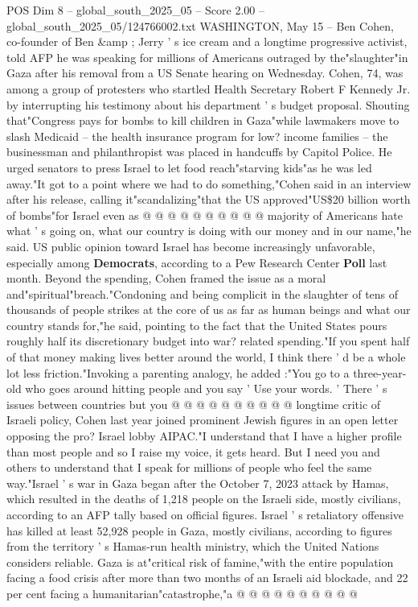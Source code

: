 \begin{textsample}{POS Dim 8 – global\_south\_2025\_05 – Score 2.00 – global\_south\_2025\_05/124766002.txt}  \label{ex:f8_pos_447}
WASHINGTON, May 15 -- Ben Cohen, co-founder of Ben \&amp ; Jerry ' s ice cream and a longtime progressive activist, told AFP he was speaking for millions of Americans outraged by the"slaughter"in Gaza after his removal from a US Senate hearing on Wednesday.
Cohen, 74, was among a group of protesters who startled Health Secretary Robert F Kennedy Jr. by interrupting his testimony about his department ' s budget proposal.
Shouting that"Congress pays for bombs to kill children in Gaza"while lawmakers move to slash Medicaid -- the health insurance program for low? income families -- the businessman and philanthropist was placed in handcuffs by Capitol Police.
He urged senators to press Israel to let food reach"starving kids"as he was led away."It got to a point where we had to do something,"Cohen said in an interview after his release, calling it"scandalizing"that the US approved"US\$20 billion worth of bombs"for Israel even as @ @ @ @ @ @ @ @ @ @ majority of Americans hate what ' s going on, what our country is doing with our money and in our name,"he said.
US public opinion toward Israel has become increasingly unfavorable, especially among \textbf{Democrats}, according to a Pew Research Center \textbf{Poll} last month.
Beyond the spending, Cohen framed the issue as a moral and"spiritual"breach."Condoning and being complicit in the slaughter of tens of thousands of people strikes at the core of us as far as human beings and what our country stands for,"he said, pointing to the fact that the United States pours roughly half its discretionary budget into war? related spending."If you spent half of that money making lives better around the world, I think there ' d be a whole lot less friction."Invoking a parenting analogy, he added :"You go to a three-year-old who goes around hitting people and you say ' Use your words. ' There ' s issues between countries but you @ @ @ @ @ @ @ @ @ @ longtime critic of Israeli policy, Cohen last year joined prominent Jewish figures in an open letter opposing the pro?
Israel lobby AIPAC."I understand that I have a higher profile than most people and so I raise my voice, it gets heard.
But I need you and others to understand that I speak for millions of people who feel the same way."Israel ' s war in Gaza began after the October 7, 2023 attack by Hamas, which resulted in the deaths of 1,218 people on the Israeli side, mostly civilians, according to an AFP tally based on official figures.
Israel ' s retaliatory offensive has killed at least 52,928 people in Gaza, mostly civilians, according to figures from the territory ' s Hamas-run health ministry, which the United Nations considers reliable.
Gaza is at"critical risk of famine,"with the entire population facing a food crisis after more than two months of an Israeli aid blockade, and 22 per cent facing a humanitarian"catastrophe,"a @ @ @ @ @ @ @ @ @ @

\end{textsample}
